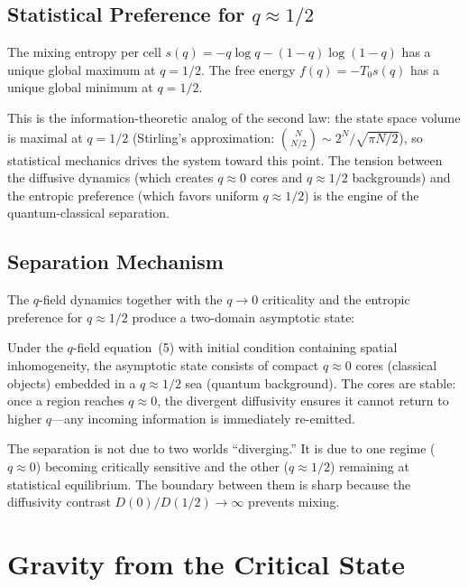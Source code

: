 \documentclass[reprint]{revtex4-2}
\begin{document}
\subsection{Statistical Preference for $q\approx 1/2$}

\begin{theorem}
\label{thm:entropic}
The mixing entropy per cell $s(q)=-q\log q-(1-q)\log(1-q)$ has a unique global maximum at $q=1/2$. The free energy $f(q)=-T_0 s(q)$ has a unique global minimum at $q=1/2$.
\end{theorem}

This is the information-theoretic analog of the second law: the state space volume is maximal at $q=1/2$ (Stirling's approximation: $\binom{N}{N/2}\sim 2^N/\sqrt{\pi N/2}$), so statistical mechanics drives the system toward this point. The tension between the diffusive dynamics (which creates $q\approx 0$ cores and $q\approx 1/2$ backgrounds) and the entropic preference (which favors uniform $q\approx 1/2$) is the engine of the quantum-classical separation.

\subsection{Separation Mechanism}

The $q$-field dynamics together with the $q\to 0$ criticality and the entropic preference for $q\approx 1/2$ produce a two-domain asymptotic state:

\begin{theorem}
\label{thm:twodomain}
Under the $q$-field equation~(5) with initial condition containing spatial inhomogeneity, the asymptotic state consists of compact $q\approx 0$ cores (classical objects) embedded in a $q\approx 1/2$ sea (quantum background). The cores are stable: once a region reaches $q\approx 0$, the divergent diffusivity ensures it cannot return to higher $q$---any incoming information is immediately re-emitted.
\end{theorem}

The separation is not due to two worlds ``diverging.'' It is due to one regime ($q\approx 0$) becoming critically sensitive and the other ($q\approx 1/2$) remaining at statistical equilibrium. The boundary between them is sharp because the diffusivity contrast $D(0)/D(1/2)\to\infty$ prevents mixing.

\section{Gravity from the Critical State}
\end{document}
